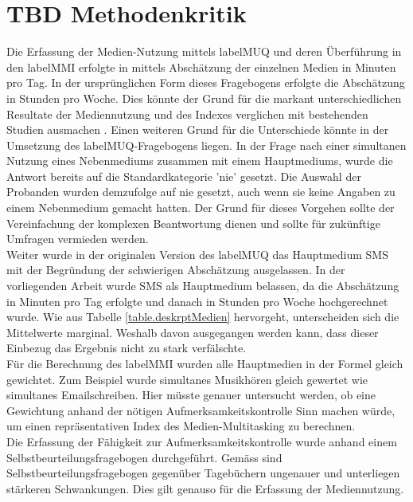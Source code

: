 \section{TBD Methodenkritik}\label{section.diskussion.methodenkritik}
Die Erfassung der Medien-Nutzung mittels \gls{labelMUQ} und deren Überführung in den \gls{labelMMI} erfolgte in mittels Abschätzung der einzelnen Medien in Minuten pro Tag. In der ursprünglichen Form dieses Fragebogens erfolgte die Abschätzung in Stunden pro Woche. Dies könnte der Grund für die markant unterschiedlichen Resultate der Mediennutzung und des Indexes verglichen mit bestehenden Studien ausmachen \cite{Ophir2009,Alzahabi2013}. Einen weiteren Grund für die Unterschiede könnte in der Umsetzung des \gls{labelMUQ}-Fragebogens liegen. In der Frage nach einer simultanen Nutzung eines Nebenmediums zusammen mit einem Hauptmediums, wurde die Antwort bereits auf die Standardkategorie 'nie' gesetzt. Die Auswahl der Probanden wurden demzufolge auf nie gesetzt, auch wenn sie keine Angaben zu einem Nebenmedium gemacht hatten. Der Grund für dieses Vorgehen sollte der Vereinfachung der komplexen Beantwortung dienen und sollte für zukünftige Umfragen vermieden werden.\\
Weiter wurde in der originalen Version des \gls{labelMUQ} das Hauptmedium SMS mit der Begründung der schwierigen Abschätzung ausgelassen. In der vorliegenden Arbeit wurde SMS als Hauptmedium belassen, da die Abschätzung in Minuten pro Tag erfolgte und danach in Stunden pro Woche hochgerechnet wurde.  Wie aus Tabelle \ref{table.deskrptMedien} hervorgeht, unterscheiden sich die Mittelwerte marginal. Weshalb davon ausgegangen werden kann, dass dieser Einbezug das Ergebnis nicht zu stark verfälschte.\\
Für die Berechnung des \gls{labelMMI} wurden alle Hauptmedien in der Formel gleich gewichtet. Zum Beispiel wurde simultanes Musikhören gleich gewertet wie simultanes Emailschreiben. Hier müsste genauer untersucht werden, ob eine Gewichtung anhand der nötigen Aufmerksamkeitskontrolle Sinn machen würde, um einen repräsentativen Index des Medien-Multitasking zu berechnen.\\
Die Erfassung der Fähigkeit zur Aufmerksamkeitskontrolle wurde anhand einem Selbstbeurteilungsfragebogen durchgeführt. Gemäss  sind Selbstbeurteilungsfragebogen gegenüber Tagebüchern ungenauer und unterliegen stärkeren Schwankungen. Dies gilt genauso für die Erfassung der Mediennutzung.

